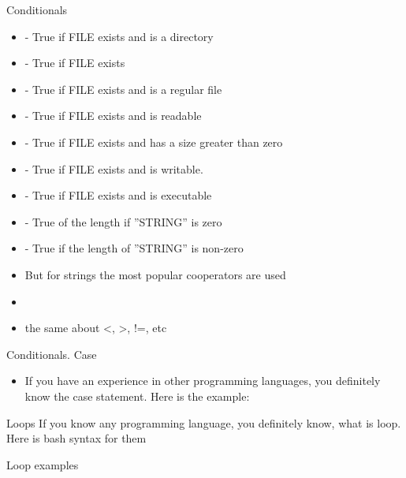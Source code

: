 \documentclass[usenames,dvipsnames,10pt,aspectratio=169]{beamer}
\begin{document}
\begin{frame}{Conditionals}
    \begin{itemize}
        \item \ex{[-d FILE]} - True if FILE exists and is a directory
        \item \ex{[-e FILE]} - True if FILE exists
        \item \ex{[-f FILE]} - True if FILE exists and is a regular file
        \item \ex{[-r FILE]} - True if FILE exists and is readable
        \item \ex{[-s FILE]} -  True if FILE exists and has a size greater than zero
        \item \ex{[-w FILE]} - True if FILE exists and is writable.
        \item \ex{[-x FILE]} -  True if FILE exists and is executable
        \item \ex{[-z STRING]} - True of the length if ”STRING” is zero
        \item \ex{[-n STRING]} - True if the length of ”STRING” is non-zero
        \item But for strings the most popular cooperators are used
        \item \ex{[STRING1 == STRING2]} 
        \item the same about <, >, !=, etc
    \end{itemize}
\end{frame}

\begin{frame}{Conditionals. Case}
    \begin{itemize}
        \item If you have an experience in other programming languages, you definitely know the case statement. Here is the example:
        
    \end{itemize}
\end{frame}

\begin{frame}{Loops}
    If you know any programming language, you definitely know, what is loop. Here is bash syntax for them
    
    
    
\end{frame}

\begin{frame}{Loop examples}
    
    
\end{frame}
\end{document}
